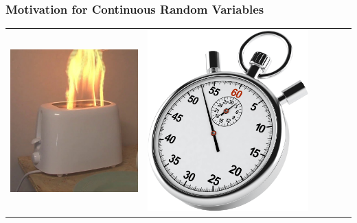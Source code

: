 \documentclass[12pt, block=fill]{beamer}
\begin{document}
\begin{frame}
  \frametitle{Motivation for Continuous Random Variables}
  \begin{tabularx}{\textwidth}{ *{6}{X} }
    \includegraphics[width=  .3  \textwidth]{figures/toaster}   & 
                                                                  \includegraphics[width=  .3 \textwidth ]{figures/clock}  & 
    \\
  \end{tabularx}
\end{frame}
\end{document}
